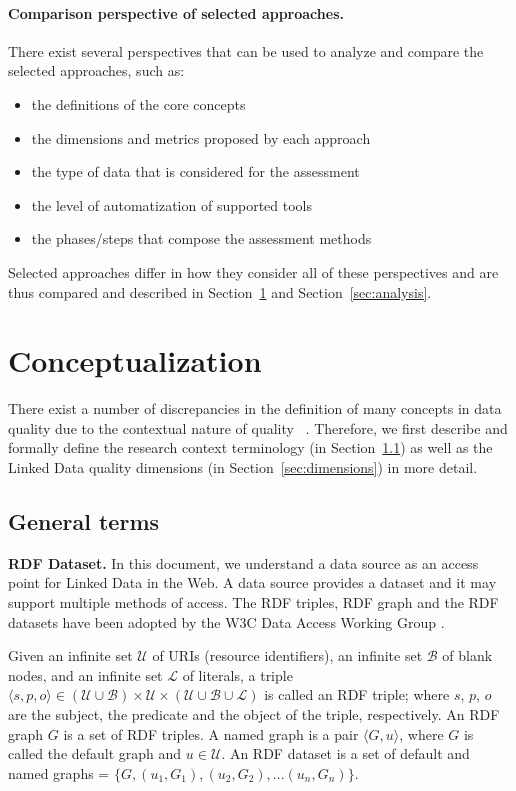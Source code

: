 \paragraph{Comparison perspective of selected approaches.}
There exist several perspectives that can be used to analyze and compare the selected approaches, such as:
\begin{itemize}
\item the definitions of the core concepts
\item the dimensions and metrics proposed by each approach
\item the type of data that is considered for the assessment
\item the level of automatization of supported tools
\item the phases/steps that compose the assessment methods
\end{itemize}
Selected approaches differ in how they consider all of these perspectives and are thus compared and described in Section~\ref{concepts} and Section~\ref{sec:analysis}.

\section{Conceptualization}
\label{concepts}

There exist a number of discrepancies in the definition of many concepts in data quality due to the contextual nature of quality~\cite{Batini:2006} .
Therefore, we first describe and formally define the research context terminology (in Section~\ref{sec:general}) as well as the Linked Data quality dimensions (in Section~\ref{sec:dimensions}) in more detail.

\subsection{General terms}
\label{sec:general}

\textbf{RDF Dataset.}
In this document, we understand a data source as an access point for Linked Data in the Web. 
A data source provides a dataset and it may support multiple methods of access.
The RDF triples, RDF graph and the RDF datasets have been adopted by the W3C Data Access Working Group \cite{Beckett:2004,Hayes:2004,Brickley2004}.

Given an infinite set $\mathcal{U}$ of URIs (resource identifiers), an infinite set $\mathcal{B}$ of blank nodes, and an infinite set $\mathcal{L}$ of literals, a triple $ \langle s, p, o \rangle \in (\mathcal{U} \cup \mathcal{B})\times \mathcal{U} \times (\mathcal{U} \cup \mathcal{B} \cup \mathcal{L})$ is called an RDF triple; where $s$, $p$, $o$ are the subject, the predicate and the object of the triple, respectively. An RDF graph $G$ is a set of RDF triples. A named graph is a pair  $\langle G,u \rangle$, where $G$ is called the default graph and $u\in\mathcal{U}$. An RDF dataset is a set of default and named graphs = $\lbrace G, (u_1,G_1), (u_2,G_2), ...(u_n,G_n)\rbrace$. 


